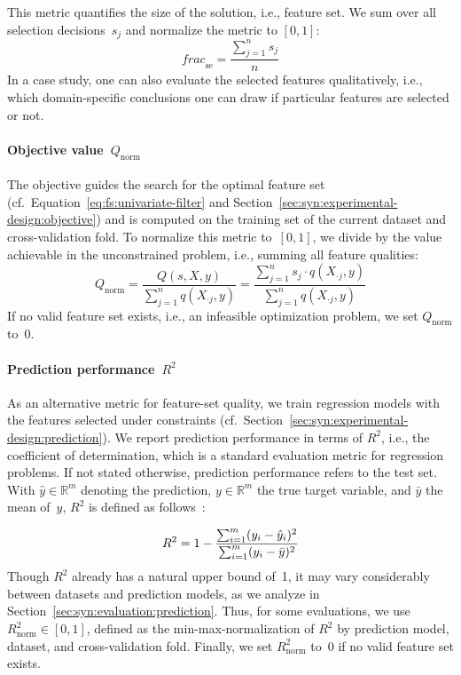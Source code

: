 This metric quantifies the size of the solution, i.e., feature set.
We sum over all selection decisions~$s_j$ and normalize the metric to $[0, 1]$:
%
\begin{equation}
	\mathit{frac}_{\text{se}} = \frac{\sum_{j=1}^{n} s_j}{n}
\end{equation}
%
In a case study, one can also evaluate the selected features qualitatively, i.e., which domain-specific conclusions one can draw if particular features are selected or not.

\paragraph{Objective value~$Q_{\text{norm}}$}

The objective guides the search for the optimal feature set (cf.~Equation~\ref{eq:fs:univariate-filter} and Section~\ref{sec:syn:experimental-design:objective}) and is computed on the training set of the current dataset and cross-validation fold.
To normalize this metric to~$[0, 1]$, we divide by the value achievable in the unconstrained problem, i.e., summing all feature qualities:
%
\begin{equation}
	Q_{\text{norm}} = \frac{Q(s,X,y)}{\sum_{j=1}^{n} q(X_{\cdot{}j},y)} = \frac{\sum_{j=1}^{n} s_j  \cdot q(X_{\cdot{}j},y)}{\sum_{j=1}^{n} q(X_{\cdot{}j},y)}
\end{equation}
%
If no valid feature set exists, i.e., an infeasible optimization problem, we set $Q_{\text{norm}}$ to~0.

\paragraph{Prediction performance~$R^2$}

As an alternative metric for feature-set quality, we train regression models with the features selected under constraints (cf.~Section~\ref{sec:syn:experimental-design:prediction}).
We report prediction performance in terms of $R^2$, i.e., the coefficient of determination, which is a standard evaluation metric for regression problems.
If not stated otherwise, prediction performance refers to the test set.
With $\hat{y} \in \mathbb{R}^m$ denoting the prediction, $y \in \mathbb{R}^m$ the true target variable, and $\bar{y}$ the mean of~$y$, $R^2$ is defined as follows~\cite{james2013linear}:

\begin{equation}
	R^2 = 1 - \frac{\sum_{i=1}^{m} (y_i - \hat{y}_i)^2}{\sum_{i=1}^m (y_i - \bar{y})^2}\\
	\label{eq:syn:r2}
\end{equation}
%
Though $R^2$ already has a natural upper bound of~1, it may vary considerably between datasets and prediction models, as we analyze in Section~\ref{sec:syn:evaluation:prediction}.
Thus, for some evaluations, we use $R^{2}_{\text{norm}} \in [0, 1]$, defined as the min-max-normalization of $R^2$ by prediction model, dataset, and cross-validation fold.
Finally, we set $R^{2}_{\text{norm}}$ to~0 if no valid feature set exists.

